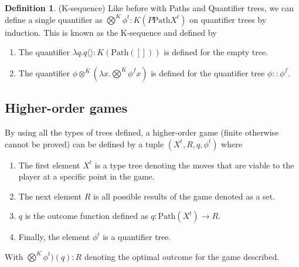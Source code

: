 \documentclass[12pt]{article}
\theoremstyle{definition}
\newtheorem{definition}{Definition}[section]
\begin{document}
\begin{definition}(K-sequence)
Like before with Paths and Quantifier trees, we can define a single quantifier as $\bigotimes^K\phi^t : K(P\text{Path} X^t)$ on quantifier trees by induction. This is known as the K-sequence and defined by
\begin{enumerate}
\item The quantifier $\lambda q.q \langle \rangle : K(\text{Path}([]))$ is defined for the empty tree.
\item The quantifier $\phi \otimes^K(\lambda x. \bigotimes^K\phi^fx)$ is defined for the quantifier tree $\phi :: \phi^f$.
\end{enumerate}
\end{definition}

\subsection{Higher-order games}
By using all the types of trees defined, a higher-order game (finite otherwise cannot be proved) can be defined by a tuple $(X^t, R, q, \phi^t)$ where
\begin{enumerate}
\item The first element $X^t$ is a type tree denoting the moves that are viable to the player at a specific point in the game.
\item The next element $R$ is all possible results of the game denoted as a set.
\item $q$ is the outcome function defined as $q : \text{Path}(X^t) \rightarrow R$.
\item Finally, the element $\phi^t$ is a quantifier tree.
\end{enumerate}
With $\bigotimes^K\phi^t)(q) : R$ denoting the optimal outcome for the game described.
\end{document}

